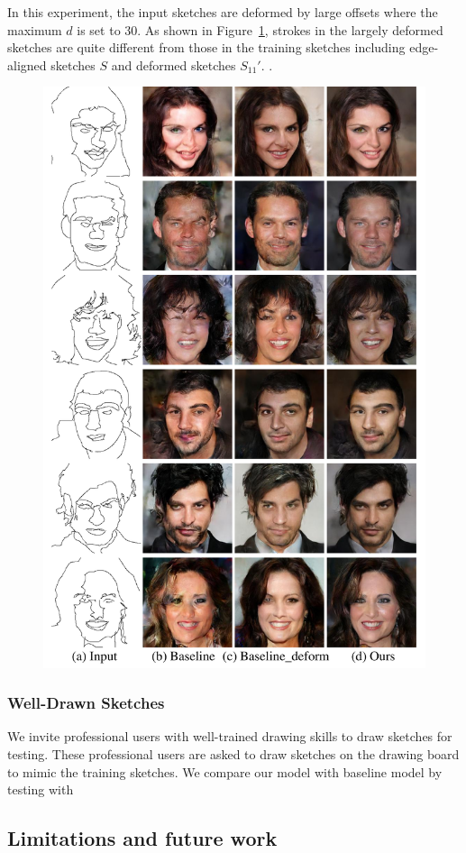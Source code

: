 In this experiment, the input sketches are deformed by large offsets where the maximum $d$ is set to $30$. 
As shown in Figure~\ref{fig:generalization_examples}, strokes in the largely deformed sketches are quite different from those in the training sketches including edge-aligned sketches $S$ and deformed sketches $S_11'$. .
\begin{figure}
	\includegraphics[width=\linewidth]{figs/generalization_examples}
	\caption{}
	\label{fig:generalization_examples}
\end{figure}

\subsubsection{Well-Drawn Sketches}

We invite professional users with well-trained drawing skills to draw sketches for testing. These professional users are asked to draw sketches on the drawing board to mimic the training sketches. 
We compare our model with baseline model by testing with 


\subsection{Limitations and future work}

\